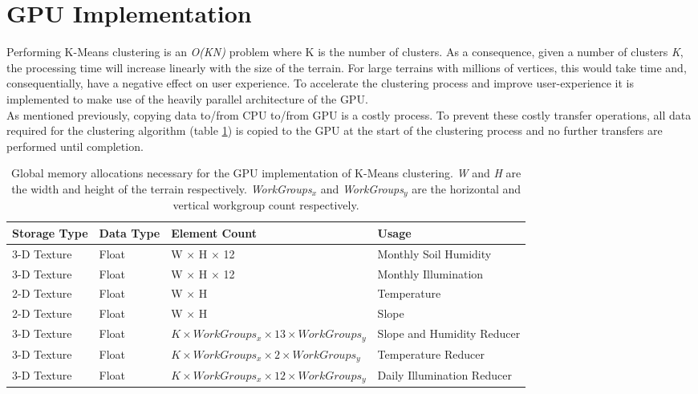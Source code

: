 \section{GPU Implementation}

Performing K-Means clustering is an \textit{O(KN)} problem where K is the number of clusters. As a consequence, given a number of clusters \textit{K}, the processing time will increase linearly with the size of the terrain. For large terrains with millions of vertices, this would take time and, consequentially, have a negative effect on user experience. To accelerate the clustering process and improve user-experience it is implemented to make use of the heavily parallel architecture of the GPU.\\

As mentioned previously, copying data to/from CPU to/from GPU is a costly process. To prevent these costly transfer operations, all data required for the clustering algorithm (table \ref{tab:clustering_mem_allocs}) is copied to the GPU at the start of the clustering process and no further transfers are performed until completion. \\

\begin{table}[]
  \centering
	    \begin{tabular}{|p{3cm}|p{1.5cm}|p{6cm}|p{5cm}|}
		\hline	
  	    \textbf{Storage Type} &  \textbf{Data Type} & \textbf{Element Count} & \textbf{Usage} \\
		\hline
		3-D Texture & Float & W $\times$ H $\times$ 12 & Monthly Soil Humidity \\
		\hline
		3-D Texture & Float & W $\times$ H $\times$ 12 & Monthly Illumination \\
		\hline
		2-D Texture & Float & W $\times$ H & Temperature \\
		\hline
		2-D Texture & Float & W $\times$ H & Slope \\
		\hline
		3-D Texture & Float & $ \textit{K} \times WorkGroups_{x} \times 13 \times WorkGroups_{y} $ &  Slope and Humidity Reducer \\
		\hline
		3-D Texture & Float & $ \textit{K} \times WorkGroups_{x} \times 2 \times WorkGroups_{y} $ &  Temperature Reducer \\
		\hline
		3-D Texture & Float & $ \textit{K} \times WorkGroups_{x} \times 12 \times WorkGroups_{y} $ & Daily Illumination Reducer \\
		\hline
		\end{tabular}
		\caption{Global memory allocations necessary for the GPU implementation of K-Means clustering. \textit{W} and \textit{H} are the width and height of the terrain respectively. \textit{WorkGroups$_{x}$} and \textit{WorkGroups$_{y}$} are the horizontal and vertical workgroup count respectively.}
	  \label{tab:clustering_mem_allocs}
\end{table}

